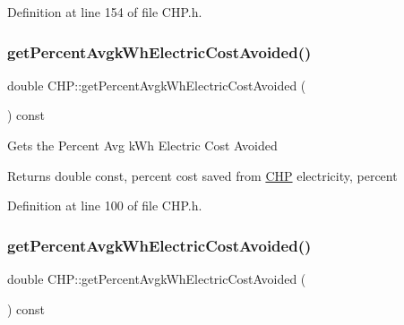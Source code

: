 Definition at line 154 of file C\+H\+P.\+h.

\mbox{\label{class_c_h_p_ad79607b304d1e50a9421de043b7a9e7b}} 
\subsubsection{\texorpdfstring{get\+Percent\+Avgk\+Wh\+Electric\+Cost\+Avoided()}{getPercentAvgkWhElectricCostAvoided()}\hspace{0.1cm}{\footnotesize\ttfamily [1/3]}}
{\footnotesize\ttfamily double C\+H\+P\+::get\+Percent\+Avgk\+Wh\+Electric\+Cost\+Avoided (\begin{DoxyParamCaption}{ }\end{DoxyParamCaption}) const\hspace{0.3cm}{\ttfamily [inline]}}

Gets the Percent Avg k\+Wh Electric Cost Avoided

\begin{DoxyReturn}{Returns}
double const, percent cost saved from \hyperlink{class_c_h_p}{C\+HP} electricity, percent 
\end{DoxyReturn}


Definition at line 100 of file C\+H\+P.\+h.

\mbox{\label{class_c_h_p_ad79607b304d1e50a9421de043b7a9e7b}} 
\subsubsection{\texorpdfstring{get\+Percent\+Avgk\+Wh\+Electric\+Cost\+Avoided()}{getPercentAvgkWhElectricCostAvoided()}\hspace{0.1cm}{\footnotesize\ttfamily [2/3]}}
{\footnotesize\ttfamily double C\+H\+P\+::get\+Percent\+Avgk\+Wh\+Electric\+Cost\+Avoided (\begin{DoxyParamCaption}{ }\end{DoxyParamCaption}) const\hspace{0.3cm}{\ttfamily [inline]}}

